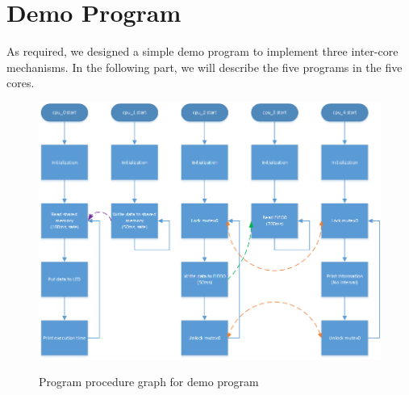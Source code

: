\documentclass[conference]{IEEEtran}
\begin{document}
\section{Demo Program}
As required, we designed a simple demo program to implement three inter-core mechanisms. In the following part, we will describe the five programs in the five cores.
\begin{figure}
	\centering
	\includegraphics[scale=0.7]{program.png}
	\label{fig2:ProgramProcedureGraph}
	\caption{Program procedure graph for demo program}
\end{figure}
\end{document}
